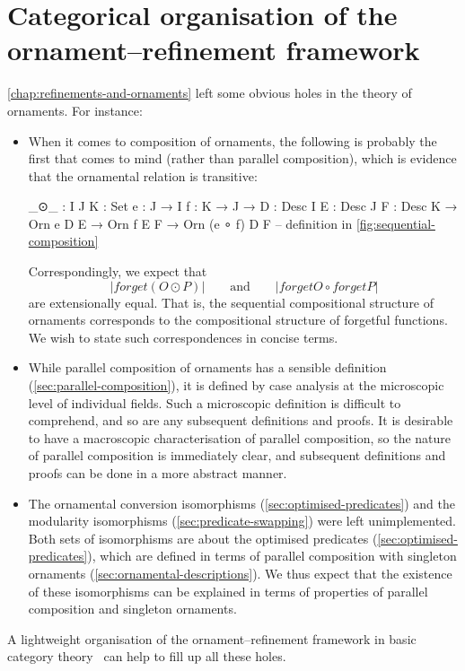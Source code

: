 \chapter{Categorical organisation of the ornament--refinement framework}
\label{chap:categorical}

\autoref{chap:refinements-and-ornaments} left some obvious holes in the theory of ornaments.
For instance:
\begin{itemize}
\item When it comes to composition of ornaments, the following  is probably the first that comes to mind (rather than parallel composition), which is evidence that the ornamental relation is transitive:
\begin{code}
_⊙_ :  {I J K : Set} {e : J → I} {f : K → J} →
       {D : Desc I} {E : Desc J} {F : Desc K} →
       Orn e D E → Orn f E F → Orn (e ∘ f) D F
-- definition in \autoref{fig:sequential-composition}
\end{code}
Correspondingly, we expect that
\[ |forget (O ⊙ P)| \qquad\text{and}\qquad |forget O ∘ forget P| \]
are extensionally equal.
That is, the sequential compositional structure of ornaments corresponds to the compositional structure of forgetful functions.
We wish to state such correspondences in concise terms.
\item While parallel composition of ornaments has a sensible definition (\autoref{sec:parallel-composition}), it is defined by case analysis at the microscopic level of individual fields.
Such a microscopic definition is difficult to comprehend, and so are any subsequent definitions and proofs.
It is desirable to have a macroscopic characterisation of parallel composition, so the nature of parallel composition is immediately clear, and subsequent definitions and proofs can be done in a more abstract manner.
\item The ornamental conversion isomorphisms (\autoref{sec:optimised-predicates}) and the modularity isomorphisms (\autoref{sec:predicate-swapping}) were left unimplemented.
Both sets of isomorphisms are about the optimised predicates (\autoref{sec:optimised-predicates}), which are defined in terms of parallel composition with singleton ornaments (\autoref{sec:ornamental-descriptions}).
We thus expect that the existence of these isomorphisms can be explained in terms of properties of parallel composition and singleton ornaments.
\end{itemize}
A lightweight organisation of the ornament--refinement framework in basic category theory~\citep{MacLane-categories} can help to fill up all these holes.
